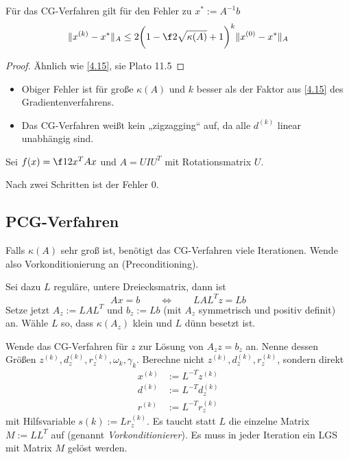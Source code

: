 \documentclass[11pt]{scrbook}
\begin{document}
\begin{st} \label{4.24}
	Für das CG-Verfahren gilt für den Fehler zu $x^* := A^{-1} b$
	\[
		\|x^{(k)} - x^*\|_A \le 2 \bigg( 1 - \f 2{{\sqrt {\kappa(A)}}+1} \bigg)^k \|x^{(0)} - x^*\|_A
	\]
	\begin{proof}
		Ähnlich wie \ref{4.15}, sie Plato 11.5
	\end{proof}
	\begin{note}
		\begin{itemize}
			\item
				Obiger Fehler ist für große $\kappa(A)$ und $k$ besser als der Faktor aus \ref{4.15} des Gradientenverfahrens.
			\item
				Das CG-Verfahren weißt kein „zigzagging“ auf, da alle $d^{(k)}$ linear unabhängig sind.
		\end{itemize}
	\end{note}
\end{st}

\begin{ex*}
	Sei $f(x) = \f 12 x^T A x$ und $A = U I U^T$ mit Rotationsmatrix $U$.

	Nach zwei Schritten ist der Fehler 0.
\end{ex*}


\subsection{PCG-Verfahren}


Falls $\kappa(A)$ sehr groß ist, benötigt das CG-Verfahren viele Iterationen.
Wende also Vorkonditionierung an (Preconditioning).

Sei dazu $L$ reguläre, untere Dreiecksmatrix, dann ist
\[
	Ax = b
	\qquad \iff \qquad
	LAL^T z = Lb
\]
Setze jetzt $A_z := LAL^T$ und $b_z := Lb$ (mit $A_z$ symmetrisch und positiv definit) an.
Wähle $L$ so, dass $\kappa(A_z)$ klein und $L$ dünn besetzt ist.

Wende das CG-Verfahren für $z$ zur Lösung von $A_z z = b_z$ an.
Nenne dessen Größen $z^{(k)}, d_z^{(k)}, r_z^{(k)} , \omega_k, \gamma_k$.
Berechne nicht $z^{(k)}, d_z^{(k)}, r_z^{(k)}$, sondern direkt
\begin{align*}
	x^{(k)} &:= L^{-T}z^{(k)} \\
	d^{(k)} &:= L^{-T}d_z^{(k)} \\
	r^{(k)} &:= L^{-T}r_z^{(k)}
\end{align*}
mit Hilfsvariable $s(k) := L r_z^{(k)}$.
Es taucht statt $L$ die einzelne Matrix $M := LL^T$ auf (genannt \emph{Vorkonditionierer}).
Es muss in jeder Iteration ein LGS mit Matrix $M$ gelöst werden.
\end{document}
